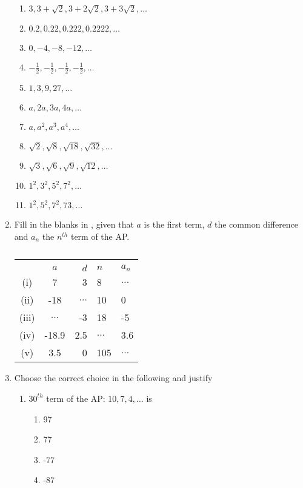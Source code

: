 \begin{enumerate}[label=\thesubsection.\arabic*, ref=\thesubsection.\theenumi]
\begin{multicols}{2}
\begin{enumerate}[itemsep=1ex]
\item $3, 3+\sqrt{2},  3+2\sqrt{2},  3+3\sqrt{2}, \dots $
\item $0.2,  0.22,  0.222,  0.2222,  \dots $
\item $0,  -4,  -8,  -12,  \dots $
\item $-\frac{1}{2},  -\frac{1}{2},  -\frac{1}{2},  -\frac{1}{2}, \dots $
\item $1,  3,  9,  27, \dots $ 
\item $a,  2a,  3a,  4a, \dots $ 
\item $a,  a^2,  a^3,  a^4, \dots $
\item $\sqrt{2},  \sqrt{8},  \sqrt{18},  \sqrt{32}, \dots $
\item $\sqrt{3},  \sqrt{6},  \sqrt{9},  \sqrt{12}, \dots $
\item $1^2,  3^2,  5^2,  7^2, \dots$
\item $1^2,  5^2,  7^2,  73, \dots $
\end{enumerate}
\end{multicols}
\item Fill in the blanks in 
	,  given that $a$ is the first term,  $d$ the common
difference and $a_n$ the $n^{th}$ term of the AP.
\begin{table}[H]
	\centering
\begin{tabular}{|c|c|r|l|l|}
\hline
\\
&$a$& $d$ & $n$ & $a_n$
\\
\hline
(i)& 	7 &3 &8 &$\dots $ 
\\
(ii)& 	-18 &$\dots $  &10  &0
\\
(iii)& 	$\dots $  &-3 &18 &-5
\\
(iv)& 	-18.9 &2.5 &$\dots $  &3.6
\\
(v)& 	3.5 &0 &105 &$\dots $ 
\\
\hline
\end{tabular}
	\caption{}
	\label{table:ap}
\end{table}
\item Choose the correct choice in the following and justify 
\begin{enumerate}
	\item $30^{th}$ term of the AP: $10,  7,  4, \dots $   is
	\begin{multicols}{4}
\begin{enumerate}
\item 97
\item 77
\item -77
\item -87
\end{enumerate}

\end{multicols}
\end{enumerate}
\end{enumerate}
